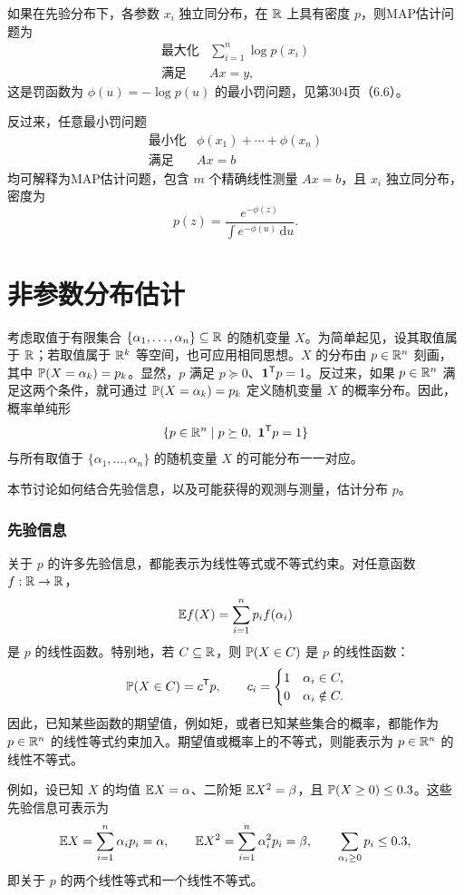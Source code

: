 如果在先验分布下，各参数 $x_i$ 独立同分布，在 $\mathbb R$ 上具有密度 $p$，则MAP估计问题为
\[
\begin{array}{ll}
\text{最大化}&\sum_{i=1}^n\log p(x_i)\\
\text{满足}&Ax=y,
\end{array}
\]
这是罚函数为 $\phi(u)=-\log p(u)$ 的最小罚问题，见第304页（6.6）。

反过来，任意最小罚问题
\[
\begin{array}{ll}
\text{最小化}&\phi(x_1)+\cdots+\phi(x_n)\\
\text{满足}&Ax=b
\end{array}
\]
均可解释为MAP估计问题，包含 $m$ 个精确线性测量 $Ax=b$，且 $x_i$ 独立同分布，密度为
\[
 p(z)=\frac{e^{-\phi(z)}}{\int e^{-\phi(u)}\,\mathrm du}.
\]

\section{非参数分布估计}
考虑取值于有限集合 $\{\alpha_1,\ldots,\alpha_n\}\subseteq\mathbb R$ 的随机变量 $X$。为简单起见，设其取值属于 $\mathbb R$；若取值属于 $\mathbb R^k$ 等空间，也可应用相同思想。$X$ 的分布由 $p\in\mathbb R^n$ 刻画，其中 $\mathbb P(X=\alpha_k)=p_k$。显然，$p$ 满足 $p\succeq0$、$\mathbf 1^{\mathsf T}p=1$。反过来，如果 $p\in\mathbb R^n$ 满足这两个条件，就可通过 $\mathbb P(X=\alpha_k)=p_k$ 定义随机变量 $X$ 的概率分布。因此，概率单纯形
\[
 \{p\in\mathbb R^n\mid p\succeq0,\ \mathbf 1^{\mathsf T}p=1\}
\]
与所有取值于 $\{\alpha_1,\ldots,\alpha_n\}$ 的随机变量 $X$ 的可能分布一一对应。

本节讨论如何结合先验信息，以及可能获得的观测与测量，估计分布 $p$。

\subsubsection*{先验信息}
关于 $p$ 的许多先验信息，都能表示为线性等式或不等式约束。对任意函数 $f:\mathbb R\to\mathbb R$，
\[
 \mathbb E f(X)=\sum_{i=1}^np_if(\alpha_i)
\]
是 $p$ 的线性函数。特别地，若 $C\subseteq\mathbb R$，则 $\mathbb P(X\in C)$ 是 $p$ 的线性函数：
\[
 \mathbb P(X\in C)=c^{\mathsf T}p,\qquad
 c_i=\begin{cases}1&\alpha_i\in C,\\0&\alpha_i\notin C.\end{cases}
\]
因此，已知某些函数的期望值，例如矩，或者已知某些集合的概率，都能作为 $p\in\mathbb R^n$ 的线性等式约束加入。期望值或概率上的不等式，则能表示为 $p\in\mathbb R^n$ 的线性不等式。

例如，设已知 $X$ 的均值 $\mathbb E X=\alpha$、二阶矩 $\mathbb E X^2=\beta$，且 $\mathbb P(X\ge0)\le0.3$。这些先验信息可表示为
\[
 \mathbb E X=\sum_{i=1}^n\alpha_ip_i=\alpha,\qquad
 \mathbb E X^2=\sum_{i=1}^n\alpha_i^2p_i=\beta,\qquad
 \sum_{\alpha_i\ge0}p_i\le0.3,
\]
即关于 $p$ 的两个线性等式和一个线性不等式。

